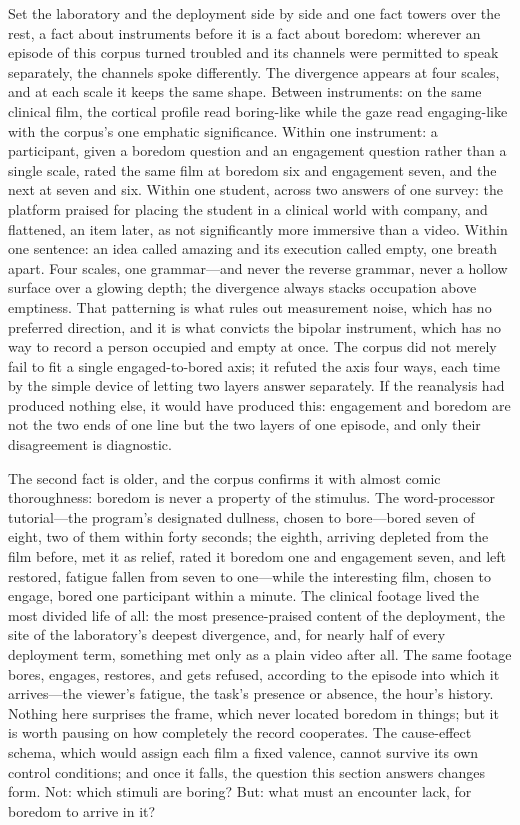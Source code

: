 \documentclass{article}
\begin{document}
Set the laboratory and the deployment side by side and one fact towers over the rest, a fact about instruments before it is a fact about boredom: wherever an episode of this corpus turned troubled and its channels were permitted to speak separately, the channels spoke differently. The divergence appears at four scales, and at each scale it keeps the same shape. Between instruments: on the same clinical film, the cortical profile read boring-like while the gaze read engaging-like with the corpus's one emphatic significance. Within one instrument: a participant, given a boredom question and an engagement question rather than a single scale, rated the same film at boredom six and engagement seven, and the next at seven and six. Within one student, across two answers of one survey: the platform praised for placing the student in a clinical world with company, and flattened, an item later, as not significantly more immersive than a video. Within one sentence: an idea called amazing and its execution called empty, one breath apart. Four scales, one grammar---and never the reverse grammar, never a hollow surface over a glowing depth; the divergence always stacks occupation above emptiness. That patterning is what rules out measurement noise, which has no preferred direction, and it is what convicts the bipolar instrument, which has no way to record a person occupied and empty at once. The corpus did not merely fail to fit a single engaged-to-bored axis; it refuted the axis four ways, each time by the simple device of letting two layers answer separately. If the reanalysis had produced nothing else, it would have produced this: engagement and boredom are not the two ends of one line but the two layers of one episode, and only their disagreement is diagnostic.

The second fact is older, and the corpus confirms it with almost comic thoroughness: boredom is never a property of the stimulus. The word-processor tutorial---the program's designated dullness, chosen to bore---bored seven of eight, two of them within forty seconds; the eighth, arriving depleted from the film before, met it as relief, rated it boredom one and engagement seven, and left restored, fatigue fallen from seven to one---while the interesting film, chosen to engage, bored one participant within a minute. The clinical footage lived the most divided life of all: the most presence-praised content of the deployment, the site of the laboratory's deepest divergence, and, for nearly half of every deployment term, something met only as a plain video after all. The same footage bores, engages, restores, and gets refused, according to the episode into which it arrives---the viewer's fatigue, the task's presence or absence, the hour's history. Nothing here surprises the frame, which never located boredom in things; but it is worth pausing on how completely the record cooperates. The cause-effect schema, which would assign each film a fixed valence, cannot survive its own control conditions; and once it falls, the question this section answers changes form. Not: which stimuli are boring? But: what must an encounter lack, for boredom to arrive in it?
\end{document}
